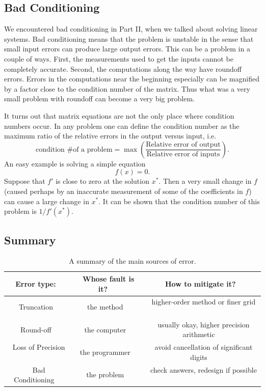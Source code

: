 \subsection*{Bad Conditioning}

We encountered bad conditioning in Part II, when we talked about
solving linear systems.  Bad conditioning means that the problem is
unstable in the sense that small input errors can produce large output
errors. This can be a problem in a couple of ways. First, the
measurements used to get the inputs cannot be completely
accurate. Second, the computations along the way have roundoff
errors. Errors in the computations near the beginning especially can be
magnified by a factor close to the condition number of the matrix.
Thus what was a very small problem with roundoff can become a very big
problem.

It turns out that matrix equations are not the only place where condition
numbers occur. In any problem one can define the condition number
as the maximum ratio of the relative errors in the output versus input, i.e.
$$      \textrm{condition \# of a problem}
          = \max \left( \frac{\text{Relative error of output}}
                             {\text{Relative error of inputs}} \right).
$$
An easy example is solving a simple equation
$$
     f(x) = 0.
$$
Suppose that $f'$ is close to zero at the solution $x^*$. Then a very
small change in $f$ (caused perhaps by an inaccurate measurement of
some of the coefficients in $f$) can cause a large change in $x^*$.
It can be shown that the condition number of this
problem is $1/f'(x^*)$.


\subsection*{Summary}

\begin{table}[hb]
\label{tab:errors}
\begin{tabular}{|c|c|c|}
\hline
\ Error type:  \ & \ Whose fault is it? \ & \ How to mitigate it? \ \\ \hline
\ Truncation \ & \ the method  \  & \ higher-order method or  finer grid \ \\
\ Round-off  \ &  \ the computer  \  & \ usually okay, higher precision arithmetic \ \\ 
\ Loss of Precision \ & \  the programmer \  & \ avoid cancellation of significant digits \  \\
\ Bad Conditioning \ &  \ the problem  \ &  \ check answers, redesign if possible \ \\
\hline
\end{tabular}
\caption{A summary of the main sources of error.}
\end{table}



